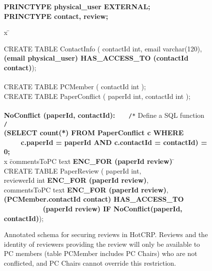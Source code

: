 \begin{figure}
\renewcommand{\FrameSep}{0.05in}
\begin{framed}
\footnotesize

{\bf PRINCTYPE physical\_user EXTERNAL;} \\
{\bf PRINCTYPE contact, review;}

\begin{tabbing}

x \= \kill


CREATE TABLE ContactInfo ( contactId int, email varchar(120), \\
\> {\bf (email physical\_user) HAS\_ACCESS\_TO (contactId contact)});\\

\\

CREATE TABLE PCMember ( contactId int ); \\

CREATE TABLE PaperConflict ( paperId int, contactId int );\\
\\

{\bf NoConflict (paperId, contactId):} ~ ~ {\tt /*} Define a SQL function {\tt */} \\
\> {\bf (SELECT count(*) FROM PaperConflict c  WHERE }\\
\> {~ ~ ~ \bf c.paperId = paperId AND c.contactId = contactId) = 0;} \\

x \= commentsToPC \= text \= {\bf ENC\_FOR (paperId review)} \= \kill
\\
CREATE TABLE PaperReview ( paperId int, \\
\> reviewerId \> int \> {\bf ENC\_FOR (paperId review)}, \\
\> commentsToPC \>text \> {\bf ENC\_FOR (paperId review)},\\


\> {\bf (PCMember.contactId contact) HAS\_ACCESS\_TO} \\
\> {\bf ~ ~ ~ ~ ~ ~ (paperId review) IF NoConflict(paperId, contactId)});

\end{tabbing}
\vspace{-0.15in}
\end{framed}
\caption{Annotated schema for securing reviews in HotCRP\@. Reviews and
the identity of reviewers providing the review will only be available to
PC members (table PCMember includes PC Chairs) who are not conflicted,
and PC Chairs cannot override this restriction.}

\label{fig:hotcrp}
\end{figure}



